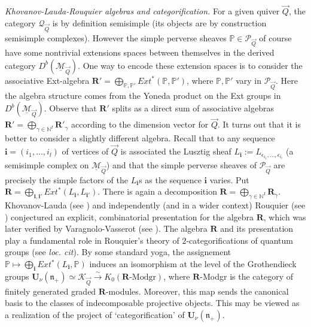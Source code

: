 \documentclass[a4paper,10pt]{amsart}
\def\U{\mathbf{U}}
\def\N{\mathbb{N}}
\def\n{\mathfrak{n}}
\numberwithin{equation}{section}
\begin{document}
\noindent
\textit{Khovanov-Lauda-Rouquier algebras and categorification.} For a given quiver $\vec{Q}$,  the category $\mathcal{Q}_{\vec{Q}}$ is by definition semisimple (its objects are by construction semisimple complexes). However the simple perverse sheaves $\mathbb{P} \in \mathcal{P}_{\vec{Q}}$ of course have some nontrivial extensions spaces between themselves in the derived category $D^b(\underline{\mathcal{M}}_{\vec{Q}})$. One way to encode these extension spaces is to consider the
associative Ext-algebra $\mathbf{R}'=\bigoplus_{\mathbb{P}, \mathbb{P}'} Ext^*(\mathbb{P},\mathbb{P}')$, where $\mathbb{P}, \mathbb{P}'$ vary in $\mathcal{P}_{\vec{Q}}$. Here the algebra structure comes from the Yoneda product on the Ext groups in $D^b(\underline{\mathcal{M}}_{\vec{Q}})$. Observe that $\mathbf{R}'$ splits as a direct sum of associative algebras $\mathbf{R}'=\bigoplus_{\gamma \in \N^I} \mathbf{R}'_{\gamma}$ according to the dimension vector for $\vec{Q}$.
It turns out that it is better to consider a slightly different algebra. Recall that to any sequence $\mathbf{i}=(i_1, \ldots, i_l)$ of vertices of $\vec{Q}$ is associated the Lusztig sheaf $L_{\mathbf{i}}:=L_{\epsilon_{i_1}, \ldots, \epsilon_{i_l}}$ (a semisimple complex on $\underline{\mathcal{M}}_{\vec{Q}}$) and that the simple perverse sheaves of $\mathcal{P}_{\vec{Q}}$ are precisely the simple factors of the $L_{\mathbf{i}}$s as the sequence $\mathbf{i}$ varies. Put $\mathbf{R}=\bigoplus_{\mathbf{i},\mathbf{i}'} Ext^*(L_{\mathbf{i}}, L_{\mathbf{i'}})$. There is again a decomposition $\mathbf{R}=\bigoplus_{\gamma \in \N^I} \mathbf{R}_{\gamma}$. Khovanov-Lauda (see \cite{KL}) and independently (and in a wider context) Rouquier (see \cite{Rouquier}) conjectured an explicit, combinatorial presentation for the algebra $\mathbf{R}$, which was later verified by Varagnolo-Vasserot (see \cite{VV2}). The algebra $\mathbf{R}$ and its presentation play a fundamental role in Rouquier's theory of $2$-categorifications of quantum groups (see \textit{loc. cit}). By some standard yoga, the assignement $\mathbb{P} \mapsto \bigoplus_{\mathbf{i}} Ext^*(L_{\mathbf{i}},\mathbb{P})$ induces an isomorphism at the level of the Grothendieck groups $\U_{\nu}(\n_+) \simeq \mathcal{K}_{\vec{Q}} \stackrel{\sim}{\to} K_0(\mathbf{R}\text{-Modgr})$, where $\mathbf{R}$-Modgr is the category of finitely generated graded $\mathbf{R}$-modules. Moreover, this map sends the canonical basis to the classes of indecomposable projective objects. This may be viewed as a realization of the project of `categorification' of $\U_{\nu}(\n_+)$.
\end{document}
